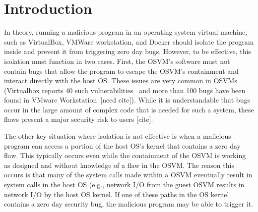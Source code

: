 \section{Introduction}
\label{sec.introduction}



In theory, running a malicious program in an operating system virtual 
machine, such as VirtualBox, VMWare workstation, and Docker should isolate the
program inside and prevent it from triggering zero day bugs.  However, to be 
effective, this isolation must function in two cases.  First, the OSVM's 
software must not contain bugs that allow the program to escape the 
OSVM's containment and interact directly with the host OS.  These
issues are very common in OSVMs (Virtualbox reports 40 such 
vulnerabilities~\cite{Virtualbox-Vulnerabilities} and more than 100 bugs have 
been found in VMware Workstation~[need cite]).  While it is understandable that
bugs occur in the large amount of complex code that is needed for such a 
system, these flaws present a major security risk to users [cite].


The other key situation where isolation is not effective is when a malicious 
program  can access a portion of the host OS's kernel that contains a zero 
day flaw.  This typically occurs even while the containment of the OSVM is 
working as designed and without knowledge of a flaw in the OSVM.  The reason
this occurs is that many of the system calls made within a OSVM eventually 
result in system calls in the host OS (e.g., network I/O from the guest
OSVM results in network I/O by the host OS kernel.  If one of these paths in
the OS kernel contains a zero day security bug, the malicious program
may be able to trigger it.


